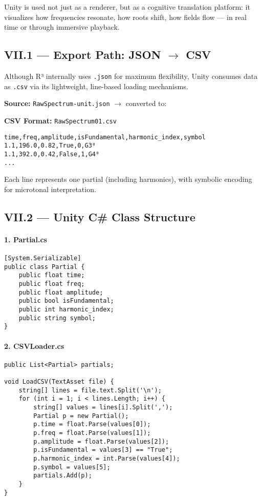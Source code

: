 \documentclass{article}
\begin{document}
Unity is used not just as a renderer, but as a cognitive translation platform: it visualizes how frequencies resonate, how roots shift, how fields flow — in real time or through immersive playback.

\subsection*{VII.1 — Export Path: JSON $\rightarrow$ CSV}

Although R³ internally uses \texttt{.json} for maximum flexibility, Unity consumes data as \texttt{.csv} via its lightweight, line-based loading mechanisms.

\textbf{Source:} \texttt{RawSpectrum-unit.json} $\rightarrow$ converted to:

\textbf{CSV Format:} \texttt{RawSpectrum01.csv}

\begin{verbatim}
time,freq,amplitude,isFundamental,harmonic_index,symbol
1.1,196.0,0.82,True,0,G3⁰
1.1,392.0,0.42,False,1,G4⁰
...
\end{verbatim}

Each line represents one partial (including harmonics), with symbolic encoding for microtonal interpretation.

\subsection*{VII.2 — Unity C\# Class Structure}

\paragraph{1. Partial.cs}

\begin{verbatim}
[System.Serializable]
public class Partial {
    public float time;
    public float freq;
    public float amplitude;
    public bool isFundamental;
    public int harmonic_index;
    public string symbol;
}
\end{verbatim}

\paragraph{2. CSVLoader.cs}

\begin{verbatim}
public List<Partial> partials;

void LoadCSV(TextAsset file) {
    string[] lines = file.text.Split('\n');
    for (int i = 1; i < lines.Length; i++) {
        string[] values = lines[i].Split(',');
        Partial p = new Partial();
        p.time = float.Parse(values[0]);
        p.freq = float.Parse(values[1]);
        p.amplitude = float.Parse(values[2]);
        p.isFundamental = values[3] == "True";
        p.harmonic_index = int.Parse(values[4]);
        p.symbol = values[5];
        partials.Add(p);
    }
}
\end{verbatim}
\end{document}
